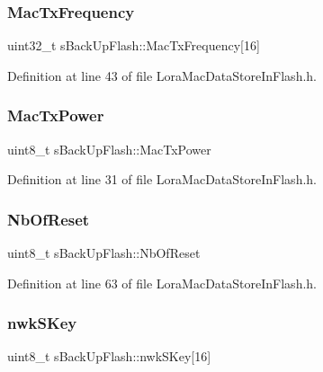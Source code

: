 \subsubsection{\texorpdfstring{Mac\+Tx\+Frequency}{MacTxFrequency}}
{\footnotesize\ttfamily uint32\+\_\+t s\+Back\+Up\+Flash\+::\+Mac\+Tx\+Frequency\mbox{[}16\mbox{]}}



Definition at line 43 of file Lora\+Mac\+Data\+Store\+In\+Flash.\+h.

\mbox{\label{structs_back_up_flash_a37e09d6a2caa964e66d5ee8ac5f7e3a0}} 
\subsubsection{\texorpdfstring{Mac\+Tx\+Power}{MacTxPower}}
{\footnotesize\ttfamily uint8\+\_\+t s\+Back\+Up\+Flash\+::\+Mac\+Tx\+Power}



Definition at line 31 of file Lora\+Mac\+Data\+Store\+In\+Flash.\+h.

\mbox{\label{structs_back_up_flash_a6b1fa618b913d529bac5adaf4ec145dc}} 
\subsubsection{\texorpdfstring{Nb\+Of\+Reset}{NbOfReset}}
{\footnotesize\ttfamily uint8\+\_\+t s\+Back\+Up\+Flash\+::\+Nb\+Of\+Reset}



Definition at line 63 of file Lora\+Mac\+Data\+Store\+In\+Flash.\+h.

\mbox{\label{structs_back_up_flash_a36e9fab419d7959dbda8c0ca24cdaf06}} 
\subsubsection{\texorpdfstring{nwk\+S\+Key}{nwkSKey}}
{\footnotesize\ttfamily uint8\+\_\+t s\+Back\+Up\+Flash\+::nwk\+S\+Key\mbox{[}16\mbox{]}}



